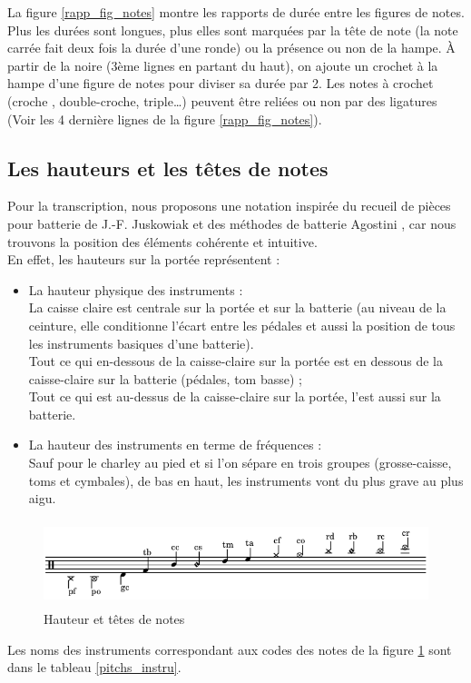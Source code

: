 La figure \ref{rapp_fig_notes} montre les rapports de durée entre les figures de notes. Plus les durées sont longues, plus elles sont marquées par la tête de note (la note carrée fait deux fois la durée d’une ronde) ou la présence ou non de la hampe. À partir de la noire (3ème lignes en partant du haut), on ajoute un crochet à la hampe d’une figure de notes pour diviser sa durée par 2. Les notes à crochet (croche , double-croche, triple…) peuvent être reliées ou non par des ligatures (Voir les 4 dernière lignes de la figure \ref{rapp_fig_notes}).
\subsection*{Les hauteurs et les têtes de notes}
Pour la transcription, nous proposons une notation inspirée du recueil de pièces pour batterie de J.-F. Juskowiak \cite{jusko} et des méthodes de batterie Agostini \cite{ago_meth_3}, car nous trouvons la position des éléments cohérente et intuitive.\\
En effet, les hauteurs sur la portée représentent :
\begin{itemize}
	\item La hauteur physique des instruments :\\
	La caisse claire est centrale sur la portée et sur la batterie (au niveau de la ceinture, elle conditionne l’écart entre les pédales et aussi la position de tous les instruments basiques d’une batterie).\\
	Tout ce qui en-dessous de la caisse-claire sur la portée est en dessous de la caisse-claire sur la batterie (pédales, tom basse) ;\\
	Tout ce qui est au-dessus de la caisse-claire sur la portée, l’est aussi sur la batterie.\\
	\item La hauteur des instruments en terme de fréquences :\\
	Sauf pour le charley au pied et si l’on sépare en trois groupes (grosse-caisse, toms et cymbales), de bas en haut, les instruments vont du plus grave au plus aigu.
\end{itemize}
\begin{figure}[!h]
	\centering
	\includegraphics[height=25mm, width=130mm]{z_images/3_methodes/0_notation_de_la_batterie/2_hauteurs_et_tete_de_notes.png}
	\caption{Hauteur et têtes de notes}
	\label{Hauteur et têtes de notes}
\end{figure}
Les noms des instruments correspondant aux codes des notes de la figure \ref{Hauteur et têtes de notes} sont dans le tableau \ref{pitchs_instru}.
